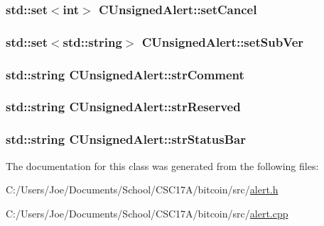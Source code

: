 \subsubsection[{set\+Cancel}]{\setlength{\rightskip}{0pt plus 5cm}std\+::set$<$int$>$ C\+Unsigned\+Alert\+::set\+Cancel}\label{class_c_unsigned_alert_ab1978ea23d02720d515bcdcf9d0dbdb0}
\hypertarget{class_c_unsigned_alert_a1b7148c413e1781222c5748935cad200}{}
\subsubsection[{set\+Sub\+Ver}]{\setlength{\rightskip}{0pt plus 5cm}std\+::set$<$std\+::string$>$ C\+Unsigned\+Alert\+::set\+Sub\+Ver}\label{class_c_unsigned_alert_a1b7148c413e1781222c5748935cad200}
\hypertarget{class_c_unsigned_alert_a8c9cd8c9706c14df3c5d6b9b1ed3b130}{}
\subsubsection[{str\+Comment}]{\setlength{\rightskip}{0pt plus 5cm}std\+::string C\+Unsigned\+Alert\+::str\+Comment}\label{class_c_unsigned_alert_a8c9cd8c9706c14df3c5d6b9b1ed3b130}
\hypertarget{class_c_unsigned_alert_a0115109fd39d48f37a412d5f50a78828}{}
\subsubsection[{str\+Reserved}]{\setlength{\rightskip}{0pt plus 5cm}std\+::string C\+Unsigned\+Alert\+::str\+Reserved}\label{class_c_unsigned_alert_a0115109fd39d48f37a412d5f50a78828}
\hypertarget{class_c_unsigned_alert_a97cfbf9a49b770bb84e49389ac1489c2}{}
\subsubsection[{str\+Status\+Bar}]{\setlength{\rightskip}{0pt plus 5cm}std\+::string C\+Unsigned\+Alert\+::str\+Status\+Bar}\label{class_c_unsigned_alert_a97cfbf9a49b770bb84e49389ac1489c2}


The documentation for this class was generated from the following files\+:\begin{DoxyCompactItemize}
\item 
C\+:/\+Users/\+Joe/\+Documents/\+School/\+C\+S\+C17\+A/bitcoin/src/\hyperlink{alert_8h}{alert.\+h}\item 
C\+:/\+Users/\+Joe/\+Documents/\+School/\+C\+S\+C17\+A/bitcoin/src/\hyperlink{alert_8cpp}{alert.\+cpp}\end{DoxyCompactItemize}
